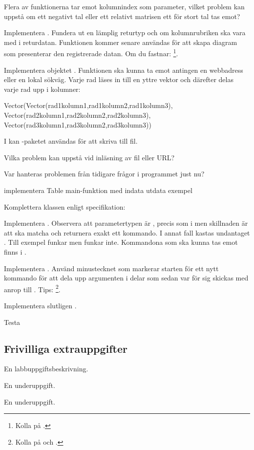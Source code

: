 \Subtask Flera av funktionerna tar emot kolumnindex som parameter, vilket problem kan uppstå om ett negativt tal eller ett relativt matrisen ett för stort tal tas emot?

\Subtask Implementera . Fundera ut en lämplig returtyp och om kolumnrubriken ska vara med i returdatan. Funktionen kommer senare användas för att skapa diagram som presenterar den registrerade datan. Om du fastnar: \footnote{Kolla på .}.

\Subtask Implementera objektet . Funktionen  ska kunna ta emot antingen en webbadress eller en lokal sökväg. Varje rad läses in till en yttre vektor och därefter delas varje rad upp i kolumner:
\begin{CodeSmall}[language=, ]
Vector(Vector(rad1kolumn1,rad1kolumn2,rad1kolumn3),
       Vector(rad2kolumn1,rad2kolumn2,rad2kolumn3),
       Vector(rad3kolumn1,rad3kolumn2,rad3kolumn3))
\end{CodeSmall}
I  kan -paketet användas för att skriva till fil.

\Subtask Vilka problem kan uppstå vid inläsning av fil eller URL?

\Subtask Var hanteras problemen från tidigare frågor i programmet just nu?

\Subtask \TODO implementera Table main-funktion med indata utdata exempel



\Task Komplettera klassen  enligt specifikation:


\Subtask Implementera . Observera att parametertypen är , precis som i  men skillnaden är att  ska matcha och returnera exakt ett kommando. I annat fall kastas undantaget . Till exempel  funkar men  funkar inte. Kommandona som ska kunna tas emot finns i .

\Subtask Implementera . Använd minustecknet som markerar starten för ett nytt kommando för att dela upp argumenten  i delar som sedan var för sig skickas med anrop till . Tips: \footnote{Kolla på  och .}.

\Subtask Implementera slutligen . 

\Subtask Testa

\subsection{Frivilliga extrauppgifter}
    
\Task En labbuppgiftsbeskrivning.

\Subtask En underuppgift.

\Subtask En underuppgift.